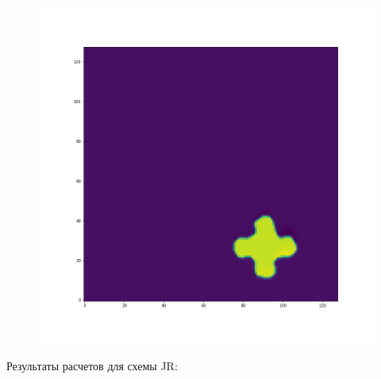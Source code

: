 \documentclass[12pt,a4paper]{article}
\begin{document}
\begin{figure}[H]
\begin{minipage}{.3\textwidth}
\end{minipage}%
\begin{minipage}{.3\textwidth}
  \centering
  \includegraphics[width=\linewidth]{Pictures/PlusRotateTestTHINC/PlusRotateTest_t50.png}
\end{minipage}
\end{figure}

Результаты расчетов для схемы JR:
\end{document}
